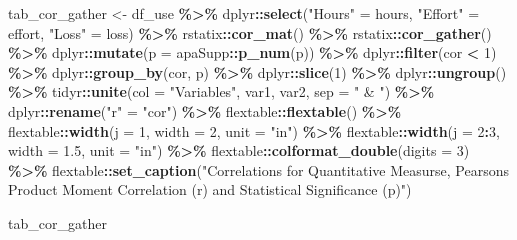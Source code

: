 \documentclass[
]{article}
\newenvironment{Shaded}{\begin{snugshade}}{\end{snugshade}}
\newcommand{\AttributeTok}[1]{\textcolor[rgb]{0.13,0.29,0.53}{#1}}
\newcommand{\DecValTok}[1]{\textcolor[rgb]{0.00,0.00,0.81}{#1}}
\newcommand{\FloatTok}[1]{\textcolor[rgb]{0.00,0.00,0.81}{#1}}
\newcommand{\FunctionTok}[1]{\textcolor[rgb]{0.13,0.29,0.53}{\textbf{#1}}}
\newcommand{\NormalTok}[1]{#1}
\newcommand{\OtherTok}[1]{\textcolor[rgb]{0.56,0.35,0.01}{#1}}
\newcommand{\SpecialCharTok}[1]{\textcolor[rgb]{0.81,0.36,0.00}{\textbf{#1}}}
\newcommand{\StringTok}[1]{\textcolor[rgb]{0.31,0.60,0.02}{#1}}
\begin{document}
\begin{Shaded}
\begin{Highlighting}[]
\NormalTok{tab\_cor\_gather }\OtherTok{\textless{}{-}}\NormalTok{ df\_use }\SpecialCharTok{\%\textgreater{}\%} 
\NormalTok{  dplyr}\SpecialCharTok{::}\FunctionTok{select}\NormalTok{(}\StringTok{"Hours"} \OtherTok{=}\NormalTok{ hours, }
                \StringTok{"Effort"} \OtherTok{=}\NormalTok{ effort, }
                \StringTok{"Loss"} \OtherTok{=}\NormalTok{ loss) }\SpecialCharTok{\%\textgreater{}\%} 
\NormalTok{  rstatix}\SpecialCharTok{::}\FunctionTok{cor\_mat}\NormalTok{() }\SpecialCharTok{\%\textgreater{}\%} 
\NormalTok{  rstatix}\SpecialCharTok{::}\FunctionTok{cor\_gather}\NormalTok{() }\SpecialCharTok{\%\textgreater{}\%} 
\NormalTok{  dplyr}\SpecialCharTok{::}\FunctionTok{mutate}\NormalTok{(}\AttributeTok{p =}\NormalTok{ apaSupp}\SpecialCharTok{::}\FunctionTok{p\_num}\NormalTok{(p)) }\SpecialCharTok{\%\textgreater{}\%} 
\NormalTok{  dplyr}\SpecialCharTok{::}\FunctionTok{filter}\NormalTok{(cor }\SpecialCharTok{\textless{}} \DecValTok{1}\NormalTok{) }\SpecialCharTok{\%\textgreater{}\%} 
\NormalTok{  dplyr}\SpecialCharTok{::}\FunctionTok{group\_by}\NormalTok{(cor, p) }\SpecialCharTok{\%\textgreater{}\%} 
\NormalTok{  dplyr}\SpecialCharTok{::}\FunctionTok{slice}\NormalTok{(}\DecValTok{1}\NormalTok{) }\SpecialCharTok{\%\textgreater{}\%} 
\NormalTok{  dplyr}\SpecialCharTok{::}\FunctionTok{ungroup}\NormalTok{() }\SpecialCharTok{\%\textgreater{}\%} 
\NormalTok{  tidyr}\SpecialCharTok{::}\FunctionTok{unite}\NormalTok{(}\AttributeTok{col =} \StringTok{"Variables"}\NormalTok{, var1, var2, }\AttributeTok{sep =} \StringTok{" \& "}\NormalTok{) }\SpecialCharTok{\%\textgreater{}\%} 
\NormalTok{  dplyr}\SpecialCharTok{::}\FunctionTok{rename}\NormalTok{(}\StringTok{"r"} \OtherTok{=} \StringTok{"cor"}\NormalTok{) }\SpecialCharTok{\%\textgreater{}\%} 
\NormalTok{  flextable}\SpecialCharTok{::}\FunctionTok{flextable}\NormalTok{() }\SpecialCharTok{\%\textgreater{}\%} 
\NormalTok{  flextable}\SpecialCharTok{::}\FunctionTok{width}\NormalTok{(}\AttributeTok{j =} \DecValTok{1}\NormalTok{, }\AttributeTok{width =} \DecValTok{2}\NormalTok{, }\AttributeTok{unit =} \StringTok{"in"}\NormalTok{) }\SpecialCharTok{\%\textgreater{}\%} 
\NormalTok{  flextable}\SpecialCharTok{::}\FunctionTok{width}\NormalTok{(}\AttributeTok{j =} \DecValTok{2}\SpecialCharTok{:}\DecValTok{3}\NormalTok{, }\AttributeTok{width =} \FloatTok{1.5}\NormalTok{, }\AttributeTok{unit =} \StringTok{"in"}\NormalTok{) }\SpecialCharTok{\%\textgreater{}\%} 
\NormalTok{  flextable}\SpecialCharTok{::}\FunctionTok{colformat\_double}\NormalTok{(}\AttributeTok{digits =} \DecValTok{3}\NormalTok{) }\SpecialCharTok{\%\textgreater{}\%} 
\NormalTok{  flextable}\SpecialCharTok{::}\FunctionTok{set\_caption}\NormalTok{(}\StringTok{"Correlations for Quantitative Measurse, Pearson\textquotesingle{}s Product Moment Correlation (r) and Statistical Significance (p)"}\NormalTok{)}

\NormalTok{tab\_cor\_gather}
\end{Highlighting}
\end{Shaded}
\end{document}
